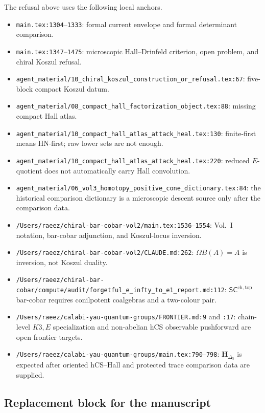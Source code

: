 The refusal above uses the following local anchors.
\begin{itemize}
\item \verb|main.tex:1304|--\verb|1333|: formal current envelope and
formal determinant comparison.
\item \verb|main.tex:1347|--\verb|1475|: microscopic Hall--Drinfeld
criterion, open problem, and chiral Koszul refusal.
\item \verb|agent_material/10_chiral_koszul_construction_or_refusal.tex:67|:
five-block compact Koszul datum.
\item \verb|agent_material/08_compact_hall_factorization_object.tex:88|:
missing compact Hall atlas.
\item \verb|agent_material/10_compact_hall_atlas_attack_heal.tex:130|:
finite-first means HN-first; raw lower sets are not enough.
\item \verb|agent_material/10_compact_hall_atlas_attack_heal.tex:220|:
reduced \(E\)-quotient does not automatically carry Hall convolution.
\item \verb|agent_material/06_vol3_homotopy_positive_cone_dictionary.tex:84|:
the historical comparison dictionary is a microscopic descent source only
after the comparison data.
\item \verb|/Users/raeez/chiral-bar-cobar-vol2/main.tex:1536|--\verb|1554|:
Vol.~I notation, bar-cobar adjunction, and Koszul-locus inversion.
\item \verb|/Users/raeez/chiral-bar-cobar-vol2/CLAUDE.md:262|:
\(\Omega B(A)=A\) is inversion, not Koszul duality.
\item \verb|/Users/raeez/chiral-bar-cobar/compute/audit/forgetful_e_infty_to_e1_report.md:112|:
\(\mathsf{SC}^{\mathrm{ch,top}}\) bar-cobar requires conilpotent
coalgebras and a two-colour pair.
\item \verb|/Users/raeez/calabi-yau-quantum-groups/FRONTIER.md:9| and
\verb|:17|: chain-level \(K3,E\) specialization and non-abelian hCS
observable pushforward are open frontier targets.
\item \verb|/Users/raeez/calabi-yau-quantum-groups/main.tex:790|--\verb|798|:
\(\mathbf H_{\Delta_5}\) is expected after oriented hCS--Hall and
protected trace comparison data are supplied.
\end{itemize}

\subsection{Replacement block for the manuscript}
\label{subsec:cell-eleven-replacement-block}

